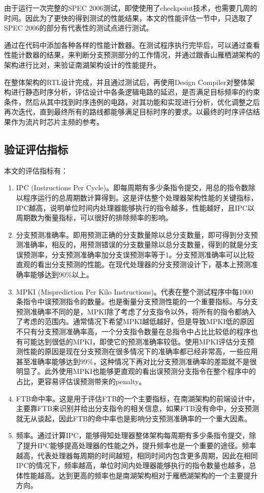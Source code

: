 由于运行一次完整的SPEC 2006测试，即使使用了checkpoint技术，也需要几周的时间。因此为了更快的得到测试的性能结果，本文的性能评估一节中，只选取了SPEC 2006的部分有代表性的测试点进行测试。

通过在代码中添加各种各样的性能计数器。在测试程序执行完毕后，可以通过查看性能计数器的结果，来判断分支预测部分的工作情况，并通过跟香山雁栖湖架构的架构进行比对，来验证南湖架构设计的性能提升。

在整体架构的RTL设计完成，并且通过测试后，再使用Design Compiler对整体架构进行静态时序分析，评估设计中各条逻辑电路的延迟，是否满足目标频率的约束条件，然后从其中找到时序违例的电路，对其功能和实现进行分析，优化调整之后再次迭代，直到最终所有的路线都能够满足目标时序的要求。以最终的时序评估结果作为流片时芯片主频的参考。

\subsection{验证评估指标}

本文的评估指标有：

\begin{enumerate}
	\item IPC (Instructions Per Cycle)。即每周期有多少条指令提交，用总的指令数除以程序运行的总周期数计算得到。这是评估整个处理器架构性能的关键指标，IPC越高，说明单位时间内处理器能够执行的指令越多，性能越好，且IPC以周期数为衡量指标，可以很好的排除频率的影响。
	\item 分支预测准确率。即用预测正确的分支数量除以总分支数量，即可得到分支预测准确率，相反的，用预测错误的分支数量除以总分支数量，得到的就是分支误预测率，分支预测准确率加分支误预测率等于1。分支预测准确率可以比较直观的看出分支预测的性能。在现代处理器的分支预测设计下，基本上预测准确率能够达到90\%以上。
	\item MPKI (Misprediction Per Kilo Instructions)。代表在整个测试程序中每1000条指令中误预测指令的数量。也是衡量分支预测性能的一个重要指标。与分支预测准确率不同的是，MPKI除了考虑了分支指令以外，将所有的指令都纳入了考虑的范围内。通常情况下希望MPKI越低越好，但是导致MPKI低的原因不只有分支预测准确率高，一个分支指令数量在总指令中占比比较低的程序也有可能达到很低的MPKI，即使它的预测准确率较低。使用MPKI评估分支预测性能的原因是现在分支预测在很多情况下的准确率都已经非常高，一些应用甚至准确率能够达到99\%，这种情况下再对比分支预测准确率的差距就不是很明显了。此外使用MPKI也能够更直观的看出误预测分支指令在整个程序中的占比，更容易评估误预测带来的penalty。
	\item FTB命中率。这是用于评估FTB的一个主要指标，在南湖架构的前端设计中，主要靠FTB来识别并给出分支指令的相关信息，如果FTB没有命中，分支预测就无从谈起，因此FTB的命中率也是影响分支预测准确率的一个重大因素。
	\item 频率。通过计算IPC，能够得知处理器整体架构每周期有多少条指令提交，除了提升IPC能够提高处理器的性能之外，提升频率也是一个重要的途径。频率越高，代表处理器每周期的时间越短，相同时间内包含更多周期，因此在相同IPC的情况下，频率越高，单位时间内处理器能够执行的指令数量也越多，总体性能越高。达到更高的频率也是南湖架构相对于雁栖湖架构的一个主要提升方向。
\end{enumerate}

